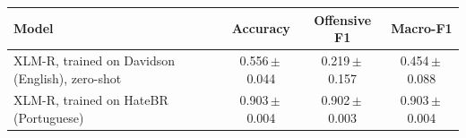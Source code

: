 \begin{tabular}{lccc}
\toprule
Model & Accuracy & Offensive F1 & Macro-F1 \\
\midrule
XLM-R, trained on Davidson (English), zero-shot & 0.556\,$\pm$\,0.044 & 0.219\,$\pm$\,0.157 & 0.454\,$\pm$\,0.088 \\
XLM-R, trained on HateBR (Portuguese) & 0.903\,$\pm$\,0.004 & 0.902\,$\pm$\,0.003 & 0.903\,$\pm$\,0.004 \\
\bottomrule
\end{tabular}
